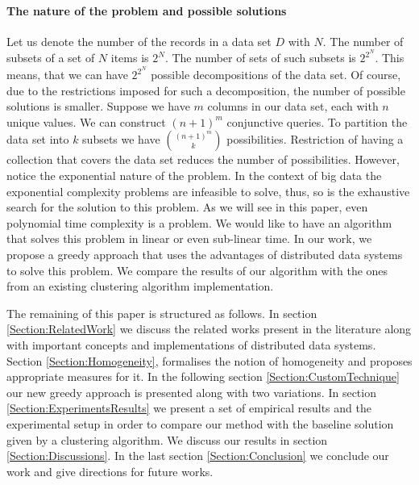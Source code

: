 \paragraph{The nature of the problem and possible solutions}
Let us denote the number of the records in a data set $D$ with $N$. The number of subsets of a set of $N$ items is $2^N$. The number of sets of such subsets is $2^{2^N}$. This means, that we can have $2^{2^N}$ possible decompositions of the data set. Of course, due to the restrictions imposed for such a decomposition, the number of possible solutions is smaller. Suppose we have $m$ columns in our data set, each with $n$ unique values.
We can construct $(n+1)^{m}$ conjunctive queries. To partition the data set into $k$ subsets we have ${(n+1)^m \choose k}$ possibilities. Restriction of having a collection that covers the data set reduces the number of possibilities. However, notice the exponential nature of the problem. In the context of big data the exponential complexity problems are infeasible to solve, thus, so is the exhaustive search for the solution to this problem. As we will see in this paper, even polynomial time complexity is a problem. We would like to have an algorithm that solves this problem in linear or even sub-linear time. In our work, we propose a greedy approach that uses the advantages of distributed data systems to solve this problem. We compare the results of our algorithm with the ones from an existing clustering algorithm implementation. 

The remaining of this paper is structured as follows. In section \ref{Section:RelatedWork} we discuss the related works present in the literature along with important concepts and implementations of distributed data systems. Section \ref{Section:Homogeneity}, formalises the notion of homogeneity and proposes appropriate measures for it. In the following section \ref{Section:CustomTechnique} our new greedy approach is presented along with two variations. In section \ref{Section:ExperimentsResults} we present a set of empirical results and the experimental setup in order to compare our method with the baseline solution given by a clustering algorithm. We discuss our results in section \ref{Section:Discussions}. In the last section \ref{Section:Conclusion} we conclude our work and give directions for future works.